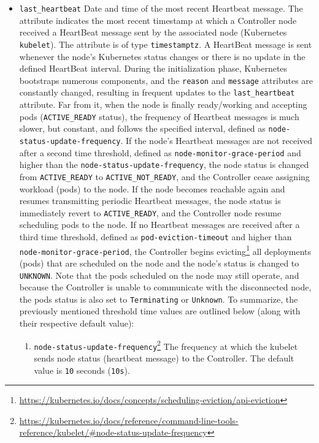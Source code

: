 \begin{itemize}
  \item \texttt{last\_heartbeat}
    \newline
    Date and time of the most recent Heartbeat message.
    \newline
    The attribute indicates the most recent timestamp at which a Controller node
    received a HeartBeat message sent by the associated node (Kubernetes \texttt{kubelet}).
    The attribute is of type \texttt{timestamptz}.
    \newline
    A HeartBeat message is sent whenever the node's Kubernetes status changes or
    there is no update in the defined HeartBeat interval\cite{k8s_heartbeat}. During
    the initialization phase, Kubernetes bootstraps numerous components, and the
    \texttt{reason} and \texttt{message} attributes are constantly changed,
    resulting in frequent updates to the \texttt{last\_heartbeat} attribute. Far
    from it, when the node is finally ready/working and accepting pods (\texttt{ACTIVE\_READY}
    status), the frequency of Heartbeat messages is much slower, but constant, and
    follows the specified interval, defined as \texttt{node-status-update-frequency}.
    If the node's Heartbeat messages are not received after a second time
    threshold, defined as \texttt{node-monitor-grace-period} and higher than the
    \texttt{node-status-update-frequency}, the node status is changed from
    \texttt{ACTIVE\_READY} to \texttt{ACTIVE\_NOT\_READY}, and the Controller cease
    assigning workload (pods) to the node. If the node becomes reachable again
    and resumes transmitting periodic Heartbeat messages, the node status is immediately
    revert to \texttt{ACTIVE\_READY}, and the Controller node resume scheduling pods
    to the node. If no Heartbeat messages are received after a third time
    threshold, defined as \texttt{pod-eviction-timeout} and higher than \texttt{node-monitor-grace-period},
    the Controller begins evicting\footnote{\url{https://kubernetes.io/docs/concepts/scheduling-eviction/api-eviction}}
    all deployments (pods) that are scheduled on the node and the node's status
    is changed to \texttt{UNKNOWN}. Note that the pods scheduled on the node may
    still operate, and because the Controller is unable to communicate with the disconnected
    node, the pods status is also set to \texttt{Terminating} or \texttt{Unknown}\cite{k8s_heartbeat}.
    \newline
    To summarize, the previously mentioned threshold time values are outlined below
    (along with their respective default value):
    \begin{enumerate}
      \item \texttt{node-status-update-frequency}\footnote{\url{https://kubernetes.io/docs/reference/command-line-tools-reference/kubelet/\#node-status-update-frequency}}
        \newline
        The frequency at which the kubelet sends node status (heartbeat message)
        to the Controller.
        \newline
        The default value is \texttt{10} seconds (\texttt{10s}).


\end{enumerate}
\end{itemize}
